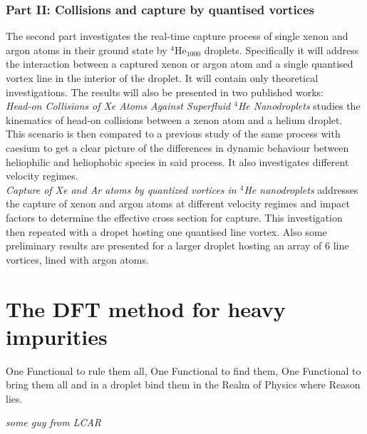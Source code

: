 \documentclass[12pt,a4paper,twosides]{book}
\begin{document}
		\subsection{Part II: Collisions and capture by quantised vortices}
			The second part investigates the real-time capture process of single xenon and argon atoms in their ground state by $^4$He$_{1000}$ droplets. Specifically it will address the interaction between a captured xenon or argon atom and a single quantised vortex line in the interior of the droplet. It will contain only theoretical investigations. The results will also be presented in two published works:\\
		
			\emph{Head-on Collisions of Xe Atoms Against Superfluid $^4\!$He Nanodroplets} studies the kinematics of head-on collisions between a xenon atom and a helium droplet. This scenario is then compared to a previous study of the same process with caesium to get a clear picture of the differences in dynamic behaviour between heliophilic and heliophobic species in said process. It also investigates different velocity regimes.\\
		
			\emph{Capture of Xe and Ar atoms by quantized vortices in $^4\!$He nanodroplets} addresses the capture of xenon and argon atoms at different velocity regimes and impact factors to determine the effective cross section for capture. This investigation then repeated with a dropet hosting one quantised line vortex. Also some preliminary results are presented for a larger droplet hosting an array of 6 line vortices, lined with argon atoms.

\chapter{The DFT method for heavy impurities}\label{sec:dft-method}
	\epigraph{One Functional to rule them all,
				One Functional to find them,
				One Functional to bring them all
				and in a droplet bind them
				in the Realm of Physics where Reason lies.}{\textit{some guy from LCAR}}
\end{document}
